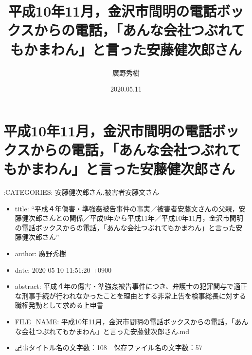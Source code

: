 \documentclass[]{ltjarticle}
\providecommand{\tightlist}{%
  \setlength{\itemsep}{0pt}\setlength{\parskip}{0pt}}
\begin{document}
\tableofcontents \newpage

\title{平成10年11月，金沢市間明の電話ボックスからの電話，「あんな会社つぶれてもかまわん」と言った安藤健次郎さん}
\author{廣野秀樹}
\date{2020.05.11}
\maketitle




\hypertarget{ux5e73ux621010ux5e7411ux6708ux91d1ux6ca2ux5e02ux9593ux660eux306eux96fbux8a71ux30dcux30c3ux30afux30b9ux304bux3089ux306eux96fbux8a71ux3042ux3093ux306aux4f1aux793eux3064ux3076ux308cux3066ux3082ux304bux307eux308fux3093ux3068ux8a00ux3063ux305fux5b89ux85e4ux5065ux6b21ux90ceux3055ux3093}{%
\section{平成10年11月，金沢市間明の電話ボックスからの電話，「あんな会社つぶれてもかまわん」と言った安藤健次郎さん}\label{ux5e73ux621010ux5e7411ux6708ux91d1ux6ca2ux5e02ux9593ux660eux306eux96fbux8a71ux30dcux30c3ux30afux30b9ux304bux3089ux306eux96fbux8a71ux3042ux3093ux306aux4f1aux793eux3064ux3076ux308cux3066ux3082ux304bux307eux308fux3093ux3068ux8a00ux3063ux305fux5b89ux85e4ux5065ux6b21ux90ceux3055ux3093}}

:CATEGORIES: 安藤健次郎さん,被害者安藤文さん

\begin{itemize}
\tightlist
\item
  title:
  ``平成４年傷害・準強姦被告事件の事実／被害者安藤文さんの父親，安藤健次郎さんとの関係／平成9年から平成11年／平成10年11月，金沢市間明の電話ボックスからの電話，「あんな会社つぶれてもかまわん」と言った安藤健次郎さん''
\item
  author: 廣野秀樹
\item
  date: 2020-05-10 11:51:20 +0900
\item
  abstract:
  平成４年の傷害・準強姦被告事件につき、弁護士の犯罪関与で適正な刑事手続が行われなかったことを理由とする非常上告を検事総長に対する職権発動として求める上申書
\item
  FILE\_NAME:
  平成10年11月，金沢市間明の電話ボックスからの電話，「あんな会社つぶれてもかまわん」と言った安藤健次郎さん.md
\item
  記事タイトル名の文字数：108　保存ファイル名の文字数：57
\end{itemize}
\end{document}
